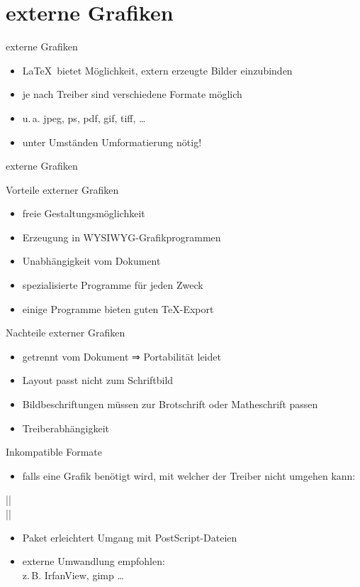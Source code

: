 \documentclass[
	vorläufig=true,
	datum=2017-11-24,
	titel={Grafiken, Abbildungen, TikZ},
	web=true,
	mo,
]{../tex/latexkurs-slides}
\begin{document}
\section{externe Grafiken}
\begin{frame}[fragile]{externe Grafiken}
	\begin{itemize}
		\item \LaTeX\ bietet Möglichkeit, extern erzeugte Bilder einzubinden
		\item je nach Treiber sind verschiedene Formate möglich
		\item u.\,a. jpeg, ps, pdf, gif, tiff, \dots
		\item unter Umständen Umformatierung nötig!
	\end{itemize}
\end{frame}

\begin{frame}{externe Grafiken}
\begin{block}{Vorteile externer Grafiken}
	\begin{itemize}
		\item freie Gestaltungsmöglichkeit
		\item Erzeugung in WYSIWYG-Grafikprogrammen
		\item Unabhängigkeit vom Dokument
		\item spezialisierte Programme für jeden Zweck
		\item einige Programme bieten guten \TeX-Export
	\end{itemize}
\end{block}
\pause
\begin{block}{Nachteile externer Grafiken}
	\begin{itemize}
		\item getrennt vom Dokument ⇒ Portabilität leidet
		\item Layout passt nicht zum Schriftbild
		\item Bildbeschriftungen müssen zur Brotschrift oder Matheschrift passen
		\item Treiberabhängigkeit
	\end{itemize}
\end{block}
\end{frame}

\begin{frame}[fragile]{Inkompatible Formate}
	\begin{itemize}
		\item falls eine Grafik benötigt wird, mit welcher der Treiber nicht umgehen kann:
	\end{itemize}
||\\
||
	\begin{itemize}
		\item Paket  erleichtert Umgang mit PostScript-Dateien
		\item externe Umwandlung empfohlen:\\%
z.\,B. IrfanView, gimp \dots
	\end{itemize}
\end{frame}
\end{document}
